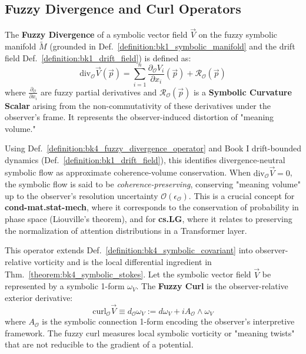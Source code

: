 \subsection{Fuzzy Divergence and Curl Operators}
\label{subsec:bk4_fuzzy_div_curl}

\begin{definition}
\label{definition:bk4_fuzzy_divergence_operator}
The \textbf{Fuzzy Divergence} of a symbolic vector field $\vec{V}$ on the fuzzy symbolic manifold $\tilde{M}$ (grounded in Def.~\ref{definition:bk1_symbolic_manifold} and the drift field Def.~\ref{definition:bk1_drift_field}) is defined as:
\[
\text{div}_{\mathcal{O}} \vec{V}(\vec{p}) = \sum_{i=1}^n \frac{\partial_{\mathcal{O}} V_i}{\partial x_i}(\vec{p}) + \mathcal{R}_{\mathcal{O}}(\vec{p})
\]
where $\frac{\partial_{\mathcal{O}}}{\partial x_i}$ are fuzzy partial derivatives and $\mathcal{R}_{\mathcal{O}}(\vec{p})$ is a \textbf{Symbolic Curvature Scalar} arising from the non-commutativity of these derivatives under the observer's frame. It represents the observer-induced distortion of "meaning volume."
\end{definition}

\begin{scholium}
\label{scholium:bk4_meaning_volume}
Using Def.~\ref{definition:bk4_fuzzy_divergence_operator} and Book I drift-bounded dynamics (Def.~\ref{definition:bk1_drift_field}), this identifies divergence-neutral symbolic flow as approximate coherence-volume conservation.
When $\text{div}_{\mathcal{O}} \vec{V} = 0$, the symbolic flow is said to be \emph{coherence-preserving}, conserving "meaning volume" up to the observer's resolution uncertainty $\mathcal{O}(\epsilon_{\mathcal{O}})$. This is a crucial concept for \textbf{cond-mat.stat-mech}, where it corresponds to the conservation of probability in phase space (Liouville's theorem), and for \textbf{cs.LG}, where it relates to preserving the normalization of attention distributions in a Transformer layer.
\end{scholium}

\begin{definition}
\label{definition:bk4_fuzzy_curl_operator}
This operator extends Def.~\ref{definition:bk4_symbolic_covariant} into observer-relative vorticity and is the local differential ingredient in Thm.~\ref{theorem:bk4_symbolic_stokes}.
Let the symbolic vector field $\vec{V}$ be represented by a symbolic 1-form $\omega_V$. The \textbf{Fuzzy Curl} is the observer-relative exterior derivative:
\[
\text{curl}_{\mathcal{O}} \vec{V} \equiv d_{\mathcal{O}} \omega_V := d\omega_V + i A_{\mathcal{O}} \wedge \omega_V
\]
where $A_{\mathcal{O}}$ is the symbolic connection 1-form encoding the observer's interpretive framework. The fuzzy curl measures local symbolic vorticity or "meaning twists" that are not reducible to the gradient of a potential.
\end{definition}

